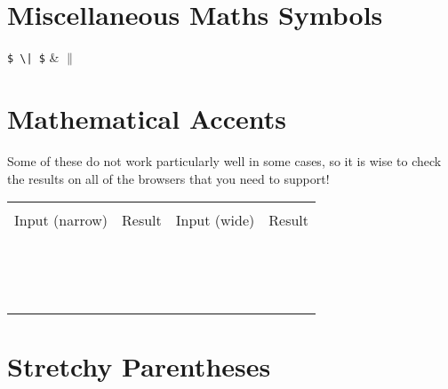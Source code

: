 \section*{Miscellaneous Maths Symbols}

\begin{demotable}
\mdemo{\aleph}
\mdemo{\imath}
\mdemo{\jmath}
\mdemo{\ell}
\mdemo{\wp}
\mdemo{\Re}
\mdemo{\Im}
\mdemo{\mho}
\mdemo{\prime}
\mdemo{\emptyset}
\mdemo{\nabla}
\mdemo{\surd}
\mdemo{\top}
\mdemo{\bot}
\mdemo{\angle}
\mdemo{\forall}
\mdemo{\exists}
\mdemo{\neg}
\mdemo{\lnot}
\mdemo{\flat}
\mdemo{\natural}
\mdemo{\sharp}
\mdemo{\backslash}
\mdemo{\partial}
\mdemo{\infty}
\mdemo{\triangle}
\mdemo{\clubsuit}
\mdemo{\diamondsuit}
\mdemo{\heartsuit}
\mdemo{\spadesuit}
\mdemo{\hbar}
\mdemo{\aa}
\mdemo{\AA}
\verb_$ \| $_ & $\|$ \\
\end{demotable}

\section*{Mathematical Accents}

Some of these do not work particularly well in some cases, so it is wise to check the
results on all of the browsers that you need to support!

\newcommand{\mademo}[1]{\minout{#1{x}} & \minout{#1{x-y}} \\ }
\newenvironment{mademotable}
{\begin{center}
 \begin{tabular}{|r|l|r|l|}
 \hline \\
 Input (narrow) & Result & Input (wide) & Result \\
 \hline \\
}{\hline
 \end{tabular}
 \end{center}
}

\begin{mademotable}
\mademo{\hat}
\mademo{\bar}
\mademo{\vec}
\mademo{\dot}
\mademo{\ddot}
\mademo{\tilde}
\mademo{\widehat}
\mademo{\widetilde}
\mademo{\overline}
\mademo{\overbrace}
\mademo{\underbrace}
\mademo{\overrightarrow}
\mademo{\overleftarrow}
\mademo{\underline}
\end{mademotable}

\section*{Stretchy Parentheses}

